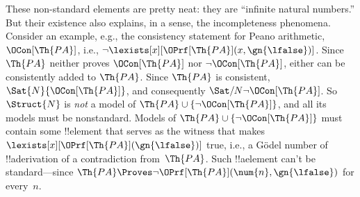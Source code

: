 \documentclass[../../../include/open-logic-section]{subfiles}
\begin{document}
These non-standard elements are pretty neat: they are ``infinite
natural numbers.'' But their existence also explains, in a sense, the
incompleteness phenomena.  Consider an example, e.g., the consistency
statement for Peano arithmetic, $\OCon[\Th{PA}]$, i.e., $\lnot
\lexists[x][\OPrf[\Th{PA}](x, \gn{\lfalse})]$. Since $\Th{PA}$ neither
proves $\OCon[\Th{PA}]$ nor $\lnot \OCon[\Th{PA}]$, either can be
consistently added to $\Th{PA}$. Since $\Th{PA}$ is consistent,
$\Sat{N}{\OCon[\Th{PA}]}$, and consequently $\Sat/{N}{\lnot
  \OCon[\Th{PA}]}$.  So $\Struct{N}$ is \emph{not} a model of $\Th{PA}
\cup \{\lnot \OCon[\Th{PA}]\}$, and all its models must be
nonstandard. Models of $\Th{PA} \cup \{\lnot \OCon[\Th{PA}]\}$ must
contain some !!{element} that serves as the witness that makes
$\lexists[x][\OPrf[\Th{PA}](\gn{\lfalse})]$ true, i.e., a G\"odel
number of !!a{derivation} of a contradiction from~$\Th{PA}$.  Such
!!a{element} can't be standard---since $\Th{PA} \Proves \lnot
\OPrf[\Th{PA}](\num{n}, \gn{\lfalse})$ for every~$n$.
\end{document}

